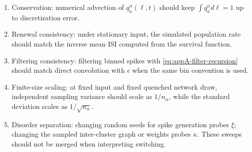 \begin{enumerate}
  \item Conservation: numerical advection of \(q_a^\alpha(\ell,t)\) should keep
  \(\int q_a^\alpha d\ell=1\) up to discretization error.

  \item Renewal consistency: under stationary input, the simulated population
  rate should match the inverse mean ISI computed from the survival function.

  \item Filtering consistency: filtering binned spikes with
  \eqref{eq:appA-filter-recursion} should match direct convolution with
  \(\epsilon\) when the same bin convention is used.

  \item Finite-size scaling: at fixed input and fixed quenched network draw,
  independent sampling variance should scale as \(1/n_\alpha\), while the
  standard deviation scales as \(1/\sqrt{n_\alpha}\).

  \item Disorder separation: changing random seeds for spike generation probes
  \(\xi\); changing the sampled inter-cluster graph or weights probes
  \(\kappa\). These sweeps should not be merged when interpreting switching.
\end{enumerate}
